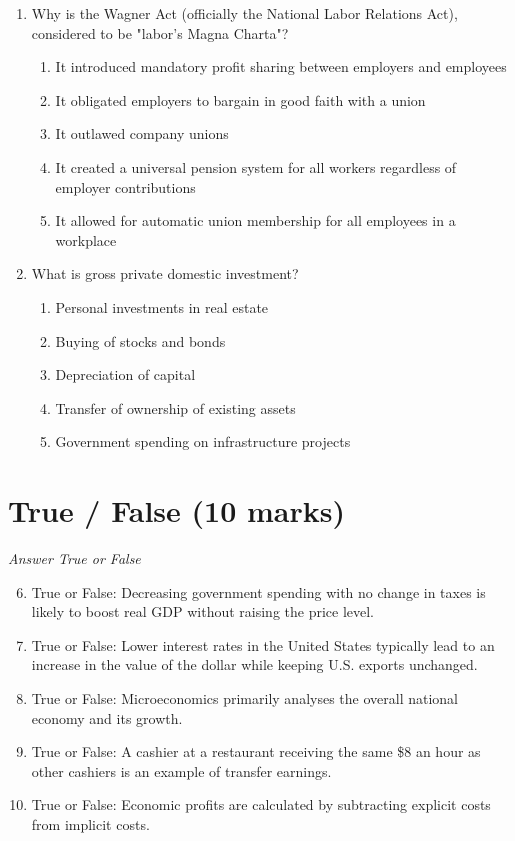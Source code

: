 \documentclass[12pt]{article}
\begin{document}
\begin{enumerate}[label=\arabic*.]
\item Why is the Wagner Act (officially the National Labor Relations Act), considered to be "labor's Magna Charta"?
\begin{enumerate}[label=(\alph*)]
    \item It introduced mandatory profit sharing between employers and employees
    \item It obligated employers to bargain in good faith with a union
    \item It outlawed company unions
    \item It created a universal pension system for all workers regardless of employer contributions
    \item It allowed for automatic union membership for all employees in a workplace
\end{enumerate}
\item What is gross private domestic investment?
\begin{enumerate}[label=(\alph*)]
    \item Personal investments in real estate
    \item Buying of stocks and bonds
    \item Depreciation of capital
    \item Transfer of ownership of existing assets
    \item Government spending on infrastructure projects
\end{enumerate}
\end{enumerate}

\section*{True / False (10 marks)}
\textit{Answer True or False}
\begin{enumerate}[label=\arabic*.]
\setcounter{enumi}{5}
\item True or False: Decreasing government spending with no change in taxes is likely to boost real GDP without raising the price level.
\item True or False: Lower interest rates in the United States typically lead to an increase in the value of the dollar while keeping U.S. exports unchanged.
\item True or False: Microeconomics primarily analyses the overall national economy and its growth.
\item True or False: A cashier at a restaurant receiving the same \$8 an hour as other cashiers is an example of transfer earnings.
\item True or False: Economic profits are calculated by subtracting explicit costs from implicit costs.
\end{enumerate}
\end{document}

